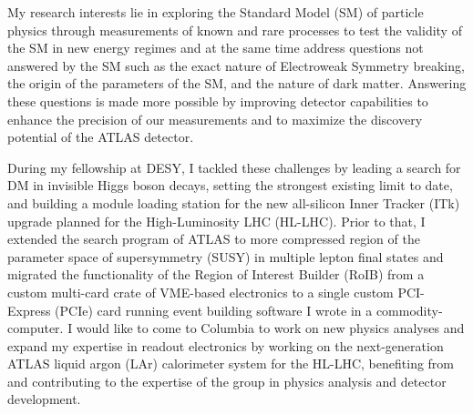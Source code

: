 \documentclass[a4paper]{article}
\begin{document}
\thispagestyle{fancy} 
 \lfoot{} \rfoot{\bf \thepage} \cfoot{}

\fontsize{11}{14}
\selectfont


My research interests lie in exploring the Standard Model (SM) of particle physics through measurements of known and rare processes
to test the validity of the SM in new energy regimes and at the same time address questions not answered by the SM such as
the exact nature of Electroweak Symmetry breaking, the origin of the parameters of the SM, and the nature of dark matter.
Answering these questions is made more possible by improving detector capabilities to enhance the precision of our measurements and to maximize the discovery potential of the ATLAS detector.

During my fellowship at DESY, I tackled these challenges by leading a search for DM in invisible Higgs boson decays, setting the strongest existing limit to date, and building a module loading station for the new all-silicon Inner Tracker (ITk) upgrade planned for the High-Luminosity LHC (HL-LHC). Prior to that, I extended the search program of ATLAS to more compressed region of the parameter space of supersymmetry (SUSY) in multiple lepton final states and migrated the functionality of the Region of Interest Builder (RoIB) from a custom multi-card crate of VME-based
electronics to a single custom PCI-Express (PCIe) card running event building software I wrote in a commodity-computer.
I would like to come to Columbia to work on new physics analyses and expand my expertise in readout electronics by working on the next-generation
ATLAS liquid argon (LAr) calorimeter system for the HL-LHC, benefiting from and contributing to the expertise of the group in physics analysis and detector development.
\end{document}
